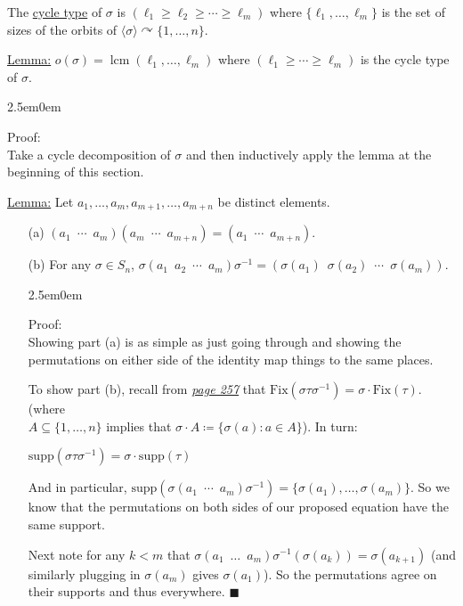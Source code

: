 \documentclass{book}
\newcommand{\inLinkRap}[2]{{\color{blue}\hyperlink{#1}{\textit{#2}}}}
\newcommand{\hTwo}{%
\color{Black}%
   \fontsize{13}{15}\selectfont%
}
\newcommand{\exTwo}{%
   \color{Purple}%
   \fontsize{13}{15}\selectfont%
}
\newcommand{\exThreeP}{%
   \color{RedViolet}%
   \fontsize{12}{14}\selectfont%
}
\newenvironment{myIndent}{%
   \begin{adjustwidth}{2.5em}{0em}%
}{%
   \end{adjustwidth}%
}
\newcommand{\udefine}[1]{{%
   \setulcolor{Red}%
   \setul{0.14em}{0.07em}%
   \ul{#1}%
}}
\newcommand{\gap}{\phantom{2}}
\newcommand{\supp}{\mathrm{supp}}
\newcommand{\Fix}{\mathrm{Fix}}
\DeclareMathOperator{\lcm}{lcm}
\newcommand{\retTwo}{\hfill\bigbreak}
\begin{document}
\hTwo The \udefine{cycle type} of $\sigma$ is $(\ell_1 \geq \ell_2 \geq \cdots \geq \ell_m)$ where $\{\ell_1, \ldots, \ell_m\}$ is the set of sizes of the orbits of $\langle \sigma \rangle \curvearrowright \{1, \ldots, n\}$.\retTwo

\exTwo\ul{Lemma:} $o(\sigma) = \lcm(\ell_1, \ldots, \ell_m)$ where $(\ell_1 \geq \cdots \geq \ell_m)$ is the cycle type of $\sigma$.

\begin{myIndent}\exThreeP
	Proof:\\
	Take a cycle decomposition of $\sigma$ and then inductively apply the lemma at the beginning of this section.\retTwo
\end{myIndent}

\exTwo\ul{Lemma:} Let $a_1, \ldots, a_{m}, a_{m+1}, \ldots, a_{m +n}$ be distinct elements.
\begin{enumerate}
	\item[(a)] $(a_1\gap\cdots\gap a_m)(a_m\gap\cdots\gap a_{m+n}) = (a_1\gap \cdots \gap a_{m + n})$.

	\item[(b)] For any $\sigma \in S_n$, $\sigma(a_1\gap a_2\gap\cdots\gap a_m)\sigma^{-1} = (\sigma(a_1)\gap \sigma(a_2)\gap \cdots \gap \sigma(a_m))$.
	
	\begin{myIndent}\exThreeP
		Proof:\\
		Showing part (a) is as simple as just going through and showing the permutations on either side of the identity map things to the same places.\retTwo

		To show part (b), recall from \inLinkRap{Alireza lemma page 257}{page 257} that $\Fix(\sigma\tau\sigma^{-1}) = \sigma \cdot \Fix(\tau)$. (where\\ $A \subseteq \{1, \ldots, n\}$ implies that $\sigma \cdot A \coloneqq \{\sigma(a) : a \in A\}$). In turn:
		
		{\centering$\supp(\sigma \tau \sigma^{-1}) = \sigma \cdot \supp(\tau)$\retTwo\par}

		And in particular, $\supp(\sigma(a_1\gap \cdots\gap a_m)\sigma^{-1}) = \{\sigma(a_1), \ldots, \sigma(a_m)\}$. So we know that the permutations on both sides of our proposed equation have the same support.\retTwo
		
		Next note for any $k < m$ that $\sigma(a_1 \gap \ldots \gap a_m)\sigma^{-1}(\sigma(a_k)) = \sigma(a_{k+1})$ (and similarly plugging in $\sigma(a_m)$ gives $\sigma(a_1)$). So the permutations agree on their supports and thus everywhere. $\blacksquare$\retTwo
	\end{myIndent}
\end{enumerate}
\end{document}
